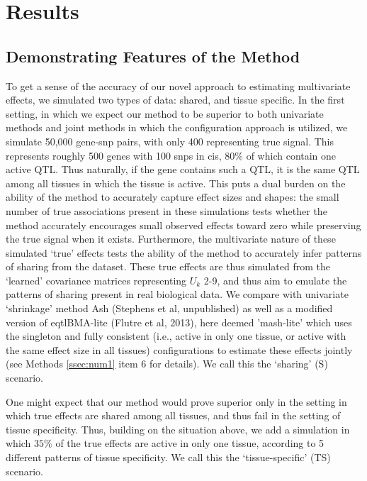 
\section{Results}
\subsection{Demonstrating Features of the Method}

To get a sense of the accuracy of our novel approach to estimating multivariate effects, we simulated two types of data: shared, and tissue specific. In the first setting, in which we expect our method to be superior to both univariate methods and joint methods in which the configuration approach is utilized, we simulate 50,000 gene-snp pairs, with only 400 representing true signal. This represents roughly 500 genes with 100 snps in cis, $80\%$ of which contain one active QTL. Thus naturally, if the gene contains such a QTL, it is the same QTL among all tissues in which the tissue is active. This puts a dual burden on the ability of the method to accurately capture effect sizes and shapes: the small number of true associations present in these simulations tests whether the method accurately encourages small observed effects toward zero while preserving the true signal when it exists. Furthermore, the  multivariate nature of these simulated `true' effects tests the ability of the method to accurately infer patterns of sharing from the dataset. These true effects are thus simulated from the `learned' covariance matrices representing $U_{k}$ 2-9, and thus aim to emulate the patterns of sharing present in real biological data. We compare with univariate `shrinkage' method Ash (Stephens et al, unpublished) as well as a modified version of eqtlBMA-lite (Flutre et al, 2013), here deemed 'mash-lite' which uses the singleton and fully consistent (i.e., active in only one tissue, or active with the same effect size in all tissues) configurations to estimate these effects jointly (see Methods \ref{ssec:num1} item 6 for details). We call this the `sharing' (S) scenario. 

One might expect that our method would prove superior only in the setting in which true effects are shared among all tissues, and thus fail in the setting of tissue specificity. Thus, building on the situation above, we add a simulation in which $35\%$ of the true effects are active in only one tissue, according to 5 different patterns of tissue specificity. We call this the `tissue-specific' (TS) scenario. 

